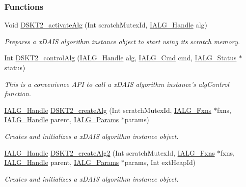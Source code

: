 \subsubsection*{Functions}
\begin{CompactItemize}
\item 
Void \hyperlink{group___d_s_p_d_s_k_t2_gf946d426d6d9a95040d3967fa746cd7a}{DSKT2\_\-activate\-Alg} (Int scratch\-Mutex\-Id, \hyperlink{struct_i_a_l_g___obj}{IALG\_\-Handle} alg)
\begin{CompactList}\small\item\em Prepares a x\-DAIS algorithm instance object to start using its scratch memory. \item\end{CompactList}\item 
Int \hyperlink{group___d_s_p_d_s_k_t2_g65d8c7ae9d40adcda0c92a9e51c6fd0b}{DSKT2\_\-control\-Alg} (\hyperlink{struct_i_a_l_g___obj}{IALG\_\-Handle} alg, \hyperlink{group__ti__xdais___i_a_l_g_g9032f20923ef2ba1d6b88c87a20075fa}{IALG\_\-Cmd} cmd, \hyperlink{struct_i_a_l_g___status}{IALG\_\-Status} $\ast$status)
\begin{CompactList}\small\item\em This is a convenience API to call a x\-DAIS algorithm instance's alg\-Control function. \item\end{CompactList}\item 
\hyperlink{struct_i_a_l_g___obj}{IALG\_\-Handle} \hyperlink{group___d_s_p_d_s_k_t2_g5528d73c34724bc310404da0dc2fbd69}{DSKT2\_\-create\-Alg} (Int scratch\-Mutex\-Id, \hyperlink{struct_i_a_l_g___fxns}{IALG\_\-Fxns} $\ast$fxns, \hyperlink{struct_i_a_l_g___obj}{IALG\_\-Handle} parent, \hyperlink{struct_i_a_l_g___params}{IALG\_\-Params} $\ast$params)
\begin{CompactList}\small\item\em Creates and initializes a x\-DAIS algorithm instance object. \item\end{CompactList}\item 
\hyperlink{struct_i_a_l_g___obj}{IALG\_\-Handle} \hyperlink{group___d_s_p_d_s_k_t2_gda6c7f86ed679447cb8f69b0c50a616c}{DSKT2\_\-create\-Alg2} (Int scratch\-Mutex\-Id, \hyperlink{struct_i_a_l_g___fxns}{IALG\_\-Fxns} $\ast$fxns, \hyperlink{struct_i_a_l_g___obj}{IALG\_\-Handle} parent, \hyperlink{struct_i_a_l_g___params}{IALG\_\-Params} $\ast$params, Int ext\-Heap\-Id)
\begin{CompactList}\small\item\em Creates and initializes a x\-DAIS algorithm instance object. \item\end{CompactList}\item 

\end{CompactItemize}
